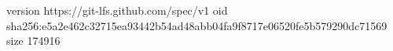 version https://git-lfs.github.com/spec/v1
oid sha256:e5a2e462c32715ea93442b54ad48abb04fa9f8717e06520fe5b579290dc71569
size 174916
